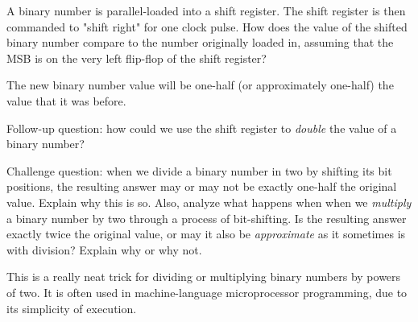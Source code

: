 
A binary number is parallel-loaded into a shift register.  The shift register is then commanded to "shift right" for one clock pulse.  How does the value of the shifted binary number compare to the number originally loaded in, assuming that the MSB is on the very left flip-flop of the shift register?







The new binary number value will be one-half (or approximately one-half) the value that it was before.

\vskip 10pt

Follow-up question: how could we use the shift register to {\it double} the value of a binary number?

\vskip 10pt

Challenge question: when we divide a binary number in two by shifting its bit positions, the resulting answer may or may not be exactly one-half the original value.  Explain why this is so.  Also, analyze what happens when when we {\it multiply} a binary number by two through a process of bit-shifting.  Is the resulting answer exactly twice the original value, or may it also be {\it approximate} as it sometimes is with division?  Explain why or why not.







This is a really neat trick for dividing or multiplying binary numbers by powers of two.  It is often used in machine-language microprocessor programming, due to its simplicity of execution.




